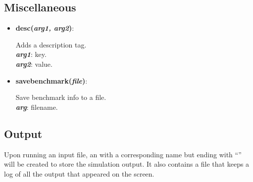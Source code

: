 \subsection{Miscellaneous}

\begin{itemize}

 \item {\textbf{desc(\textit{arg1, arg2})}:
				\flushright\parbox{0.9 \textwidth}{\vspace{-0.25cm} 
				Adds a description tag.\\
				\textbf{\textit{arg1}}: key.\\
				\textbf{\textit{arg2}}: value.
				}\flushleft}

 \item {\vspace{-0.4cm}\textbf{savebenchmark(\textit{file})}:
				\flushright\parbox{0.9 \textwidth}{\vspace{-0.25cm} 
				Save benchmark info to a file.\\
				\textbf{\textit{arg}}: filename.
				}\flushleft}

\end{itemize}


\subsection{Output}


Upon running an input file, an  with a corresponding name but ending with ``'' will be created to store the simulation output. It also contains a file  that keeps a log of all the output that appeared on the screen.  



